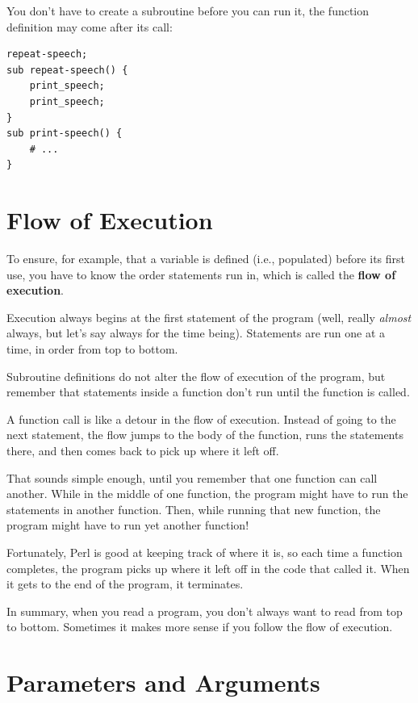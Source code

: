 You don't have to create a subroutine before you can run it, 
the function definition may come after its call:
\begin{verbatim}
repeat-speech;
sub repeat-speech() {
    print_speech;
    print_speech;
}
sub print-speech() {
    # ...
}
\end{verbatim}


\section{Flow of Execution}

To ensure, for example, that a variable is defined (i.e., populated) 
before its first use, you have to know the order statements run in, 
which is called the {\bf flow of execution}.

Execution always begins at the first statement of the program 
(well, really \emph{almost} always, but let's say always 
for the time being). Statements are run one at a time, 
in order from top to bottom.

Subroutine definitions do not alter the flow of execution of the
program, but remember that statements inside a function don't
run until the function is called.

A function call is like a detour in the flow of execution. Instead of
going to the next statement, the flow jumps to the body of
the function, runs the statements there, and then comes back
to pick up where it left off.

That sounds simple enough, until you remember that one function can
call another.  While in the middle of one function, the program might
have to run the statements in another function.  Then, while
running that new function, the program might have to run yet
another function!

Fortunately, Perl is good at keeping track of where it is, so each
time a function completes, the program picks up where it left off in
the code that called it.  When it gets to the end of the program,
it terminates.

In summary, when you read a program, you
don't always want to read from top to bottom.  Sometimes it makes
more sense if you follow the flow of execution.


\section{Parameters and Arguments}
\label{parameters}


